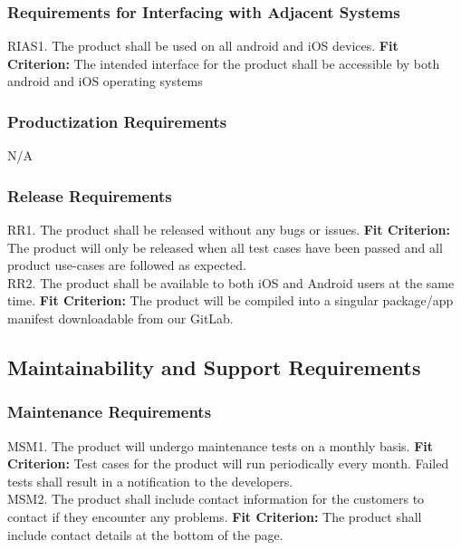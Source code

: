 \documentclass[12pt, titlepage]{article}
\begin{document}
\subsubsection{Requirements for Interfacing with Adjacent Systems}

RIAS1. The product shall be used on all android and iOS devices.
	\textbf{Fit Criterion:} The intended interface for the product shall be accessible by both android 
and iOS operating systems

\subsubsection{Productization Requirements}

N/A

\subsubsection{Release Requirements}

RR1. The product shall be released without any bugs or issues.
	\textbf{Fit Criterion:} The product will only be released when all test cases have been passed and all product use-cases are followed as expected.\\

\noindent RR2. The product shall be available to both iOS and Android users at the same time.
	\textbf{Fit Criterion:} The product will be compiled into a singular package/app manifest downloadable from our GitLab.

\subsection{Maintainability and Support Requirements}

\subsubsection{Maintenance Requirements}

MSM1. The product will undergo maintenance tests on a monthly basis.
	\textbf{Fit Criterion:} Test cases for the product will run periodically every month. Failed tests shall result in a notification to the developers.\\

\noindent MSM2. The product shall include contact information for the customers to contact if they encounter any problems.
	\textbf{Fit Criterion:}  The product shall include contact details at the bottom of the page.\\
\end{document}
